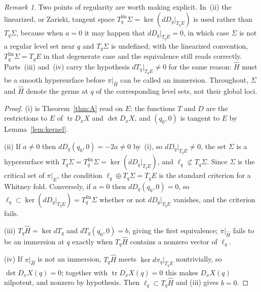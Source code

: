 \documentclass[12pt]{article}
\theoremstyle{plain}
\theoremstyle{definition}
\theoremstyle{remark}
\newtheorem{remark}[theorem]{Remark}
\newcommand{\tr}{\operatorname{tr}}
\DeclareMathOperator{\dt}{det}
\newcommand{\Hh}{\widehat{H}}
\begin{document}
	\begin{remark}\label{rem:regularityB}
		Two points of regularity are worth making explicit.  In~(ii) the
		linearized, or Zariski, tangent space
		$T^{\mathrm{lin}}_{q}\Sigma=\ker(dD_{q}|_{T_{q}E})$ is used rather than
		$T_{q}\Sigma$, because when $a=0$ it may happen that
		$dD_{q}|_{T_{q}E}=0$, in which case $\Sigma$ is not a regular level set
		near $q$ and $T_{q}\Sigma$ is undefined; with the linearized
		convention, $T^{\mathrm{lin}}_{q}\Sigma=T_{q}E$ in that degenerate case
		and the equivalence still reads correctly.  Parts~(iii) and~(iv) carry
		the hypothesis $dT_{q}|_{T_{q}E}\neq0$ for the same reason: $\Hh$ must
		be a smooth hypersurface before $\pi|_{\Hh}$ can be called an
		immersion.  Throughout, $\Sigma$ and $\Hh$ denote the germs at $q$ of
		the corresponding level sets, not their global loci.
	\end{remark}
	
	\begin{proof}
		(i) is Theorem~\ref{thm:A} read on $E$: the functions $T$ and $D$ are
		the restrictions to $E$ of $\tr D_{x}X$ and $\dt D_{x}X$, and
		$(q_{0},0)$ is tangent to $E$ by Lemma~\ref{lem:kernel}.
		
		(ii) If $a\neq0$ then $dD_{q}(q_{0},0)=-2a\neq0$ by~(i), so
		$dD_{q}|_{T_{q}E}\neq0$, the set $\Sigma$ is a hypersurface with
		$T_{q}\Sigma=T^{\mathrm{lin}}_{q}\Sigma=\ker(dD_{q}|_{T_{q}E})$, and
		$\ell_{q}\not\subset T_{q}\Sigma$.  Since $\Sigma$ is the critical set
		of $\pi|_{E}$, the condition $\ell_{q}\oplus T_{q}\Sigma=T_{q}E$ is the
		standard criterion for a Whitney fold.  Conversely, if $a=0$ then
		$dD_{q}(q_{0},0)=0$, so $\ell_{q}\subset\ker(dD_{q}|_{T_{q}E})
		=T^{\mathrm{lin}}_{q}\Sigma$ whether or not $dD_{q}|_{T_{q}E}$
		vanishes, and the criterion fails.
		
		(iii) $T_{q}\Hh=\ker dT_{q}$ and $dT_{q}(q_{0},0)=b$, giving the first
		equivalence; $\pi|_{\Hh}$ fails to be an immersion at $q$ exactly when
		$T_{q}\Hh$ contains a nonzero vector of $\ell_{q}$.
		
		(iv) If $\pi|_{\Hh}$ is not an immersion, $T_{q}\Hh$ meets
		$\ker d\pi_{q}|_{T_{q}E}$ nontrivially, so $\dt D_{x}X(q)=0$; together
		with $\tr D_{x}X(q)=0$ this makes $D_{x}X(q)$ nilpotent, and nonzero by
		hypothesis.  Then $\ell_{q}\subset T_{q}\Hh$ and (iii) gives $b=0$.
	\end{proof}
	
\end{document}
